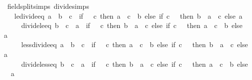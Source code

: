 \begin{isabellebody}
\endisatagproof
{\isafoldproof}%
%
\isadelimproof
\isanewline
%
\endisadelimproof
\isanewline
{}\isamarkupfalse%
\ {\isacharbrackleft}{\kern0pt}field{\isacharunderscore}{\kern0pt}split{\isacharunderscore}{\kern0pt}simps{\isacharcomma}{\kern0pt}\ divide{\isacharunderscore}{\kern0pt}simps{\isacharbrackright}{\kern0pt}{\isacharcolon}{\kern0pt}\isanewline
\ \ \ le{\isacharunderscore}{\kern0pt}divide{\isacharunderscore}{\kern0pt}eq{\isacharcolon}{\kern0pt}\ {\isachardoublequoteopen}a\ {\isasymle}\ b\ {\isacharslash}{\kern0pt}\ c\ {\isasymlongleftrightarrow}\ {\isacharparenleft}{\kern0pt}if\ {}\ {\isacharless}{\kern0pt}\ c\ then\ a\ {\isacharasterisk}{\kern0pt}\ c\ {\isasymle}\ b\ else\ if\ c\ {\isacharless}{\kern0pt}\ {}\ then\ b\ {\isasymle}\ a\ {\isacharasterisk}{\kern0pt}\ c\ else\ a\ {\isasymle}\ {}{\isacharparenright}{\kern0pt}{\isachardoublequoteclose}\isanewline
\ \ \ \ \ divide{\isacharunderscore}{\kern0pt}le{\isacharunderscore}{\kern0pt}eq{\isacharcolon}{\kern0pt}\ {\isachardoublequoteopen}b\ {\isacharslash}{\kern0pt}\ c\ {\isasymle}\ a\ {\isasymlongleftrightarrow}\ {\isacharparenleft}{\kern0pt}if\ {}\ {\isacharless}{\kern0pt}\ c\ then\ b\ {\isasymle}\ a\ {\isacharasterisk}{\kern0pt}\ c\ else\ if\ c\ {\isacharless}{\kern0pt}\ {}\ then\ a\ {\isacharasterisk}{\kern0pt}\ c\ {\isasymle}\ b\ else\ {}\ {\isasymle}\ a{\isacharparenright}{\kern0pt}{\isachardoublequoteclose}\isanewline
\ \ \ \ \ less{\isacharunderscore}{\kern0pt}divide{\isacharunderscore}{\kern0pt}eq{\isacharcolon}{\kern0pt}\ {\isachardoublequoteopen}a\ {\isacharless}{\kern0pt}\ b\ {\isacharslash}{\kern0pt}\ c\ {\isasymlongleftrightarrow}\ {\isacharparenleft}{\kern0pt}if\ {}\ {\isacharless}{\kern0pt}\ c\ then\ a\ {\isacharasterisk}{\kern0pt}\ c\ {\isacharless}{\kern0pt}\ b\ else\ if\ c\ {\isacharless}{\kern0pt}\ {}\ then\ b\ {\isacharless}{\kern0pt}\ a\ {\isacharasterisk}{\kern0pt}\ c\ else\ a\ {\isacharless}{\kern0pt}\ {}{\isacharparenright}{\kern0pt}{\isachardoublequoteclose}\isanewline
\ \ \ \ \ divide{\isacharunderscore}{\kern0pt}less{\isacharunderscore}{\kern0pt}eq{\isacharcolon}{\kern0pt}\ {\isachardoublequoteopen}b\ {\isacharslash}{\kern0pt}\ c\ {\isacharless}{\kern0pt}\ a\ {\isasymlongleftrightarrow}\ {\isacharparenleft}{\kern0pt}if\ {}\ {\isacharless}{\kern0pt}\ c\ then\ b\ {\isacharless}{\kern0pt}\ a\ {\isacharasterisk}{\kern0pt}\ c\ else\ if\ c\ {\isacharless}{\kern0pt}\ {}\ then\ a\ {\isacharasterisk}{\kern0pt}\ c\ {\isacharless}{\kern0pt}\ b\ else\ {}\ {\isacharless}{\kern0pt}\ a{\isacharparenright}{\kern0pt}{\isachardoublequoteclose}\isanewline

\end{isabellebody}
